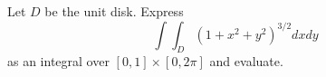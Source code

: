 Let \( D \) be the unit disk. Express
\[
\int\int_D (1 + x^2 + y^2)^{3/2} dxdy
\]
as an integral over \([0, 1] \times [0, 2\pi]\) and evaluate.
